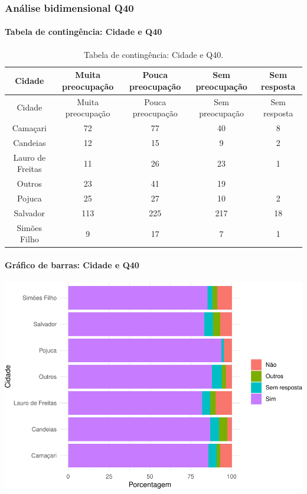 \documentclass[]{article}
\let\oldparagraph\paragraph
\renewcommand{\paragraph}[1]{\oldparagraph{#1}\mbox{}}
\begin{document}
\cleardoublepage

\hypertarget{anuxe1lise-bidimensional-q40}{%
\subsubsection{Análise bidimensional Q40}\label{anuxe1lise-bidimensional-q40}}

\hypertarget{tabela-de-continguxeancia-cidade-e-q40}{%
\paragraph{Tabela de contingência: Cidade e Q40}\label{tabela-de-continguxeancia-cidade-e-q40}}

\begin{longtable}[]{@{}ccccc@{}}
\caption{\label{tab:unnamed-chunk-1547}Tabela de contingência: Cidade e Q40.}\tabularnewline
\toprule
Cidade & Muita preocupação & Pouca preocupação & Sem preocupação & Sem resposta\tabularnewline
\midrule
\endfirsthead
\toprule
Cidade & Muita preocupação & Pouca preocupação & Sem preocupação & Sem resposta\tabularnewline
\midrule
\endhead
Camaçari & 72 & 77 & 40 & 8\tabularnewline
Candeias & 12 & 15 & 9 & 2\tabularnewline
Lauro de Freitas & 11 & 26 & 23 & 1\tabularnewline
Outros & 23 & 41 & 19 &\tabularnewline
Pojuca & 25 & 27 & 10 & 2\tabularnewline
Salvador & 113 & 225 & 217 & 18\tabularnewline
Simões Filho & 9 & 17 & 7 & 1\tabularnewline
\bottomrule
\end{longtable}

\hypertarget{gruxe1fico-de-barras-cidade-e-q40}{%
\paragraph{Gráfico de barras: Cidade e Q40}\label{gruxe1fico-de-barras-cidade-e-q40}}

\begin{center}\includegraphics[width=0.75\linewidth]{relatorio_covid19_files/figure-latex/unnamed-chunk-1548-1} \end{center}
\end{document}
